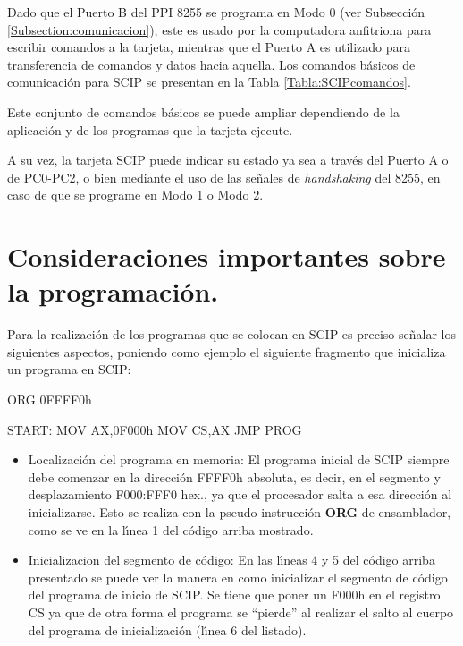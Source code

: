 Dado que el Puerto B del PPI 8255 se programa en Modo 0 (ver Subsecci\'on %
\ref{Subsection:comunicacion}), este es usado por la computadora anfitriona para escribir %
comandos a la tarjeta, mientras que el Puerto A es utilizado para transferencia de comandos y %
datos hacia aquella. Los comandos b\'asicos de comunicaci\'on para SCIP se presentan en la %
Tabla \ref{Tabla:SCIPcomandos}.

Este conjunto de comandos b\'asicos se puede ampliar dependiendo de la aplicaci\'on y de los %
programas que la tarjeta ejecute.

A su vez, la tarjeta SCIP puede indicar su estado ya sea a trav\'es del Puerto A o de PC0-PC2, o %
bien mediante el uso de las se\~nales de {\it handshaking\/} del 8255, en caso de que se %
programe en Modo 1 o Modo 2.


\section{Consideraciones importantes sobre la programaci\'on.}
\label{Section:consideraciones}

Para la realizaci\'on de los programas que se colocan en SCIP es preciso se\~nalar los %
siguientes aspectos, poniendo como ejemplo el siguiente fragmento que inicializa un programa en %
SCIP:

\begin{listing}{1}
   ORG 0FFFF0h

 START:
   MOV AX,0F000h
   MOV CS,AX
   JMP PROG
\end{listing} 

\begin{itemize}

\item Localizaci\'on del programa en memoria: El programa inicial de SCIP siempre debe comenzar %
en la direcci\'on FFFF0h absoluta, es decir, en el segmento y desplazamiento F000:FFF0 hex., ya %
que el procesador salta a esa direcci\'on al inicializarse. Esto se realiza con la pseu\-do\-%
ins\-truc\-ci\'on {\bf ORG} de ensamblador, como se ve en la l\'{\i}nea 1 del c\'odigo %
arriba mostrado.

\item Inicializacion del segmento de c\'odigo: En las l\'{\i}neas 4 y 5 del c\'odigo arriba %
presentado se puede ver la manera en como inicializar el segmento de c\'odigo del programa de %
inicio de SCIP. Se tiene que poner un F000h en el registro CS ya que de otra forma el programa %
se ``pierde'' al realizar el salto al cuerpo del programa de inicializaci\'on (l\'{\i}nea 6 %
del listado).
\end{itemize}

